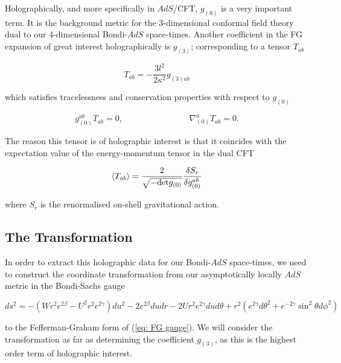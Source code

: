 \documentclass[a4paper,11pt]{article}
\numberwithin{equation}{section}
\begin{document}
Holographically, and more specifically in $AdS$/CFT, $g_{(0)}$ is a very important term. It is the background metric for the 3-dimensional conformal field theory dual to our 4-dimensional Bondi-$AdS$ space-times. Another coefficient in the FG expansion of great interest holographically is $g_{(3)}$; corresponding to a tensor $T_{ab}$ \cite{deHaro:2000vlm}

\begin{equation}
T_{ab}=-\frac{3l^2}{2\kappa^2}g_{(3)ab}
\end{equation}

\noindent which satisfies tracelessness and conservation properties with respect to $g_{(0)}$

\begin{equation} \label{eq: g_3_conditions}
g_{(0)}^{ab}T_{ab}=0, \qquad \phantom{aaaaaaaaaaa} \nabla_{(0)}^aT_{ab}=0.
\end{equation}

The reason this tensor is of holographic interest is that it coincides with the expectation value of the energy-momentum tensor in the dual CFT \cite{Henningson:1998gx, Balasubramanian:1999re, deHaro:2000vlm, Skenderis:2002wp}

\begin{equation}
\braket{T_{ab}}=\frac{2}{\sqrt{-\text{det}g_{(0)}}}\frac{\delta S_{r}}{\delta g_{(0)}^{ab}}
\end{equation}

\noindent where $S_r$ is the renormalised on-shell gravitational action.



\subsection{The Transformation}
\noindent In order to extract this holographic data for our Bondi-$AdS$ space-times, we need to construct the coordinate transformation from our asymptotically locally $AdS$ metric in the Bondi-Sachs gauge

\begin{equation} \label{eq: Bondi_Sachs_Metric}
ds^2=-(Wr^{2}e^{2\beta}-U^2r^2e^{2\gamma})du^2-2e^{2\beta}dudr-2Ur^2e^{2\gamma}dud\theta+r^2(e^{2\gamma}d\theta^2+e^{-2\gamma}\sin^2\theta d\phi^2) 
\end{equation}

\noindent to the Fefferman-Graham form of (\ref{eq: FG gauge}). We will consider the transformation as far as determining the coefficient $g_{(3)}$, as this is the highest order term of holographic interest.
\end{document}
